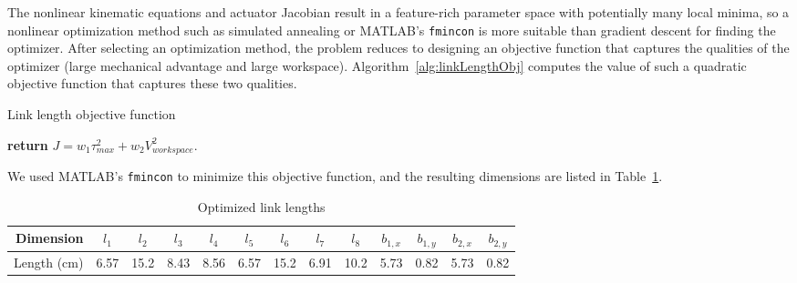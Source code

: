 \documentclass{report}
\begin{document}
The nonlinear kinematic equations and actuator Jacobian result in a feature-rich parameter space with potentially many local minima, so a nonlinear optimization method such as simulated annealing or MATLAB's \texttt{fmincon} is more suitable than gradient descent for finding the optimizer.  After selecting an optimization method, the problem reduces to designing an objective function that captures the qualities of the optimizer (large mechanical advantage and large workspace). Algorithm~\ref{alg:linkLengthObj} computes the value of such a quadratic objective function that captures these two qualities.

\begin{algorithm}
	\caption{Link length objective function} \label{alg:linkLengthObj}
	\begin{algorithmic}
		 
		\EndIf
		\EndFor
		\State \textbf{return} $J = w_{1}\tau_{max}^2 + w_{2}V_{workspace}^2$.
		\EndFunction
	\end{algorithmic}
\end{algorithm}

We used MATLAB's \texttt{fmincon} to minimize this objective function, and the resulting dimensions are listed in Table~\ref{table:optimalDims}.

\begin{table}[H]
\begin{center}
  \begin{tabular}{ r | c  c  c  c  c  c  c  c  c  c  c  c}
  	Dimension & $l_{1}$ & $l_{2}$ & $l_{3}$ & $l_{4}$ & $l_{5}$ & $l_{6}$ & $l_{7}$ & $l_{8}$ & $b_{1,x}$ & $b_{1,y}$ & $b_{2,x}$ & $b_{2,y}$ \\ \hline
    Length (cm) & 6.57 & 15.2 & 8.43 & 8.56 & 6.57 & 15.2 & 6.91 & 10.2 & 5.73 & 0.82 & 5.73 & 0.82
  \end{tabular}
\end{center}
\caption[Optimized link lengths]{Optimized link lengths}\label{table:optimalDims}
\end{table}
\end{document}
